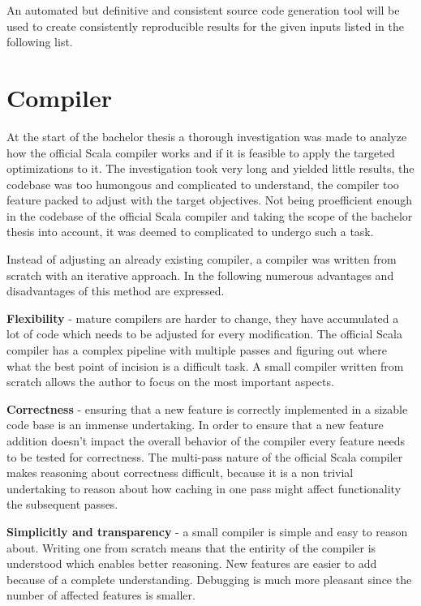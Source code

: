\documentclass{VUMIFPSbakalaurinis}
\begin{document}
An automated but definitive and consistent source code generation tool will be used to create consistently reproducible results for the given inputs listed in the following list.

\section{Compiler}
At the start of the bachelor thesis a thorough investigation was made to analyze how the official Scala compiler works \cite{ScalaGithub} and if it is feasible to apply the targeted optimizations to it.
The investigation took very long and yielded little results, the codebase was too humongous and complicated to understand, the compiler too feature packed to adjust with the target objectives.
Not being proefficient enough in the codebase of the official Scala compiler and taking the scope of the bachelor thesis into account, it was deemed to complicated to undergo such a task.

Instead of adjusting an already existing compiler, a compiler was written from scratch with an iterative approach.
In the following numerous advantages and disadvantages of this method are expressed.

\textbf{Flexibility} - mature compilers are harder to change, they have accumulated a lot of code which needs to be adjusted for every modification.
The official Scala compiler has a complex pipeline with multiple passes and figuring out where what the best point of incision is a difficult task.
A small compiler written from scratch allows the author to focus on the most important aspects.

\textbf{Correctness} - ensuring that a new feature is correctly implemented in a sizable code base is an immense undertaking.
In order to ensure that a new feature addition doesn't impact the overall behavior of the compiler every feature needs to be tested for correctness.
The multi-pass nature of the official Scala compiler makes reasoning about correctness difficult, because it is a non trivial undertaking to reason about how caching in one pass might affect functionality the subsequent passes.

\textbf{Simplicitly and transparency} - a small compiler is simple and easy to reason about.
Writing one from scratch means that the entirity of the compiler is understood which enables better reasoning.
New features are easier to add because of a complete understanding.
Debugging is much more pleasant since the number of affected features is smaller.
\end{document}
